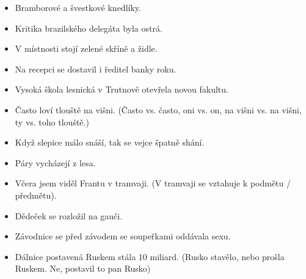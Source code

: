 \documentclass[12pt]{article}					%
\begin{document}
\begin{poznamka}
	\begin{itemize}
		\item Bramborové a švestkové knedlíky.
		\item Kritika brazilského delegáta byla ostrá.
		\item V místnosti stojí zelené skříně a židle.
		\item Na recepci se dostavil i ředitel banky roku.
		\item Vysoká škola lesnická v Trutnově otevřela novou fakultu.
		\item Často loví tlouště na višni. (Často vs. často, oni vs. on, na višni vs. na višni, ty vs. toho tlouště.)
		\item Když slepice málo snáší, tak se vejce špatně shání.
		\item Páry vycházejí z lesa.
		\item Včera jsem viděl Frantu v tramvaji. (V tramvaji se vztahuje k podmětu / předmětu).
		\item Dědeček se rozložil na gauči.
		\item Závodnice se před závodem se soupeřkami oddávala sexu.
		\item Dálnice postavená Ruskem stála 10 miliard. (Rusko stavělo, nebo prošla Ruskem. Ne, postavil to pan Rusko)
	\end{itemize}


\end{poznamka}
\end{document}

